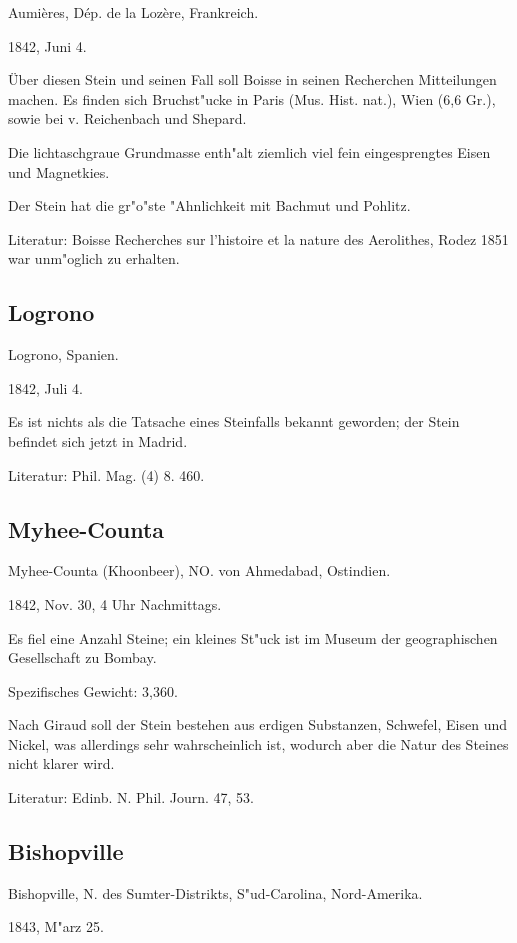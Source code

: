 \documentclass[a4paper, 11pt, oneside]{article}
\begin{document}
Aumières, Dép. de la Lozère, Frankreich.

1842, Juni 4.

Über diesen Stein und seinen Fall soll Boisse in seinen Recherchen Mitteilungen machen. Es finden sich Bruchst"ucke in Paris (Mus. Hist. nat.), Wien (6,6 Gr.), sowie bei v. Reichenbach und Shepard.

Die lichtaschgraue Grundmasse enth"alt ziemlich viel fein eingesprengtes Eisen und Magnetkies.

Der Stein hat die gr"o"ste "Ahnlichkeit mit Bachmut und Pohlitz.

Literatur: Boisse Recherches sur l'histoire et la nature des Aerolithes, Rodez 1851 war unm"oglich zu erhalten.

\subsection{Logrono}

Logrono, Spanien.

1842, Juli 4.

Es ist nichts als die Tatsache eines Steinfalls bekannt geworden; der Stein befindet sich jetzt in Madrid.

Literatur: Phil. Mag. (4) 8. 460.

\subsection{Myhee-Counta}

Myhee-Counta (Khoonbeer), NO. von Ahmedabad, Ostindien.

1842, Nov. 30, 4 Uhr Nachmittags.

Es fiel eine Anzahl Steine; ein kleines St"uck ist im Museum der geographischen Gesellschaft zu Bombay.

Spezifisches Gewicht: 3,360.

Nach Giraud soll der Stein bestehen aus erdigen Substanzen, Schwefel, Eisen und Nickel, was allerdings sehr wahrscheinlich ist, wodurch aber die Natur des Steines nicht klarer wird.

Literatur: Edinb. N. Phil. Journ. 47, 53.

\subsection{Bishopville}

Bishopville, N. des Sumter-Distrikts, S"ud-Carolina, Nord-Amerika.

1843, M"arz 25.
\end{document}
